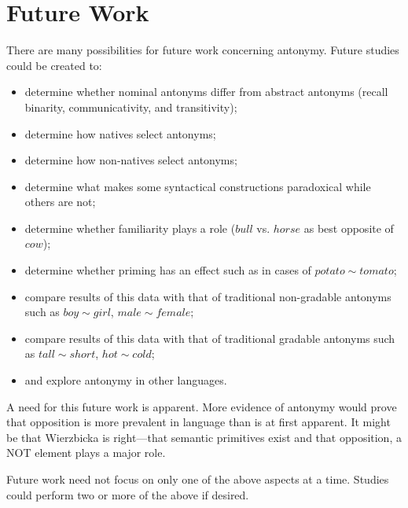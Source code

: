 \section {Future Work}
There are many possibilities for future work concerning antonymy.  Future studies could be created to:
	\begin {itemize}
		\item determine whether nominal antonyms differ from abstract antonyms (recall binarity, communicativity, and transitivity);
		\item determine how natives select antonyms;
		\item determine how non-natives select antonyms;
		\item determine what makes some syntactical constructions paradoxical while others are not;
		\item determine whether familiarity plays a role ($bull$ vs. $horse$ as best opposite of $cow$);
		\item determine whether priming has an effect such as in cases of $potato\sim tomato$;
		\item compare results of this data with that of traditional non-gradable antonyms such as $boy\sim girl$, $male\sim female$;
		\item compare results of this data with that of traditional gradable antonyms such as $tall\sim short$, $hot\sim cold$;
		\item and explore antonymy in other languages.  
	\end {itemize}
A need for this future work is apparent.  More evidence of antonymy would prove that opposition is more prevalent in language than is at first apparent.  It might be that Wierzbicka is right—that semantic primitives exist and that opposition, a NOT element plays a major role.

Future work need not focus on only one of the above aspects at a time.  Studies could perform two or more of the above if desired.

